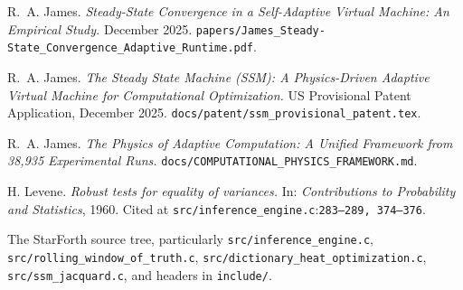 \documentclass[11pt,letterpaper,openany]{book}
\theoremstyle{definition}
\theoremstyle{plain}
\newcommand{\sourceref}[2]{\texttt{#1}:\texttt{#2}}
\begin{document}
\begin{description}\setlength\itemsep{2pt}
  \item[\textnormal{[SSRN]}] R.~A. James.
    \emph{Steady-State Convergence in a Self-Adaptive Virtual Machine:
    An Empirical Study.} December 2025.
    \texttt{papers/James\_Steady-State\_Convergence\_Adaptive\_Runtime.pdf}.
  \item[\textnormal{[Patent]}] R.~A. James.
    \emph{The Steady State Machine (SSM): A Physics-Driven Adaptive Virtual
    Machine for Computational Optimization.}
    US Provisional Patent Application, December 2025.
    \texttt{docs/patent/ssm\_provisional\_patent.tex}.
  \item[\textnormal{[Framework]}] R.~A. James.
    \emph{The Physics of Adaptive Computation: A Unified Framework from
    38{,}935 Experimental Runs.}
    \texttt{docs/COMPUTATIONAL\_PHYSICS\_FRAMEWORK.md}.
  \item[\textnormal{[Levene-1960]}] H. Levene.
    \emph{Robust tests for equality of variances.}
    In: \emph{Contributions to Probability and Statistics}, 1960.
    Cited at \sourceref{src/inference\_engine.c}{283--289, 374--376}.
  \item[\textnormal{[Code]}] The StarForth source tree, particularly
    \texttt{src/inference\_engine.c}, \texttt{src/rolling\_window\_of\_truth.c},
    \texttt{src/dictionary\_heat\_optimization.c}, \texttt{src/ssm\_jacquard.c},
    and headers in \texttt{include/}.
\end{description}
\end{document}
